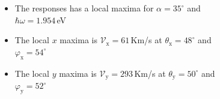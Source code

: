 \documentclass{beamer}
\begin{document}
\begin{frame}

\begin{columns}


{\small

\vspace{-2mm}
\begin{itemize}

\item The responses has a local maxima for $\alpha = 35^{\circ}$ and $\hbar
\omega = 1.954$\,eV

\item The local $x$ maxima is 
$\mathcal{V}_{\mathrm{x}} = 61$\,Km/s at
$\theta_{\mathrm{x}} = 48^{\circ}$ and
$\varphi_{\mathrm{x}} = 54^{\circ}$

\item The local $y$ maxima is 
$\mathcal{V}_{\mathrm{y}} = 293$\,Km/s at 
$\theta_{\mathrm{y}} =50^{\circ}$ and
$\varphi_{\mathrm{y}} = 52^{\circ}$

\end{itemize}

}

\begin{center}

\vspace{-8mm}
\begin{figure}[h!]
\end{figure}
\end{center}
\end{columns}
\end{frame}
\end{document}
